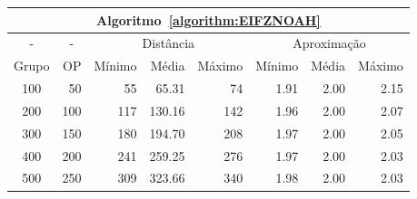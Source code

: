 \begin{table}[!htb]
  \begin{tabular}{|c|r|r|r|r|r|r|r|}
    \hline
    \multicolumn{8}{|c|}{Algoritmo~\ref{algorithm:EIFZNOAH}}                                                                    \\ \hline
      -      & \multicolumn{1}{c|}{-} & \multicolumn{3}{c|}{Distância}             & \multicolumn{3}{c|}{Aproximação}           \\ \hline
    Grupo    & OP                     & Mínimo       & Média        & Máximo       & Mínimo       & Média        & Máximo       \\ \hline  
    100      & 50                     & 55           & 65.31        & 74           & 1.91         & 2.00         & 2.15         \\ \hline
    200      & 100                    & 117          & 130.16       & 142          & 1.96         & 2.00         & 2.07         \\ \hline
    300      & 150                    & 180          & 194.70       & 208          & 1.97         & 2.00         & 2.05         \\ \hline
    400      & 200                    & 241          & 259.25       & 276          & 1.97         & 2.00         & 2.03         \\ \hline
    500      & 250                    & 309          & 323.66       & 340          & 1.98         & 2.00         & 2.03         \\ \hline    
  \end{tabular}
\end{table}